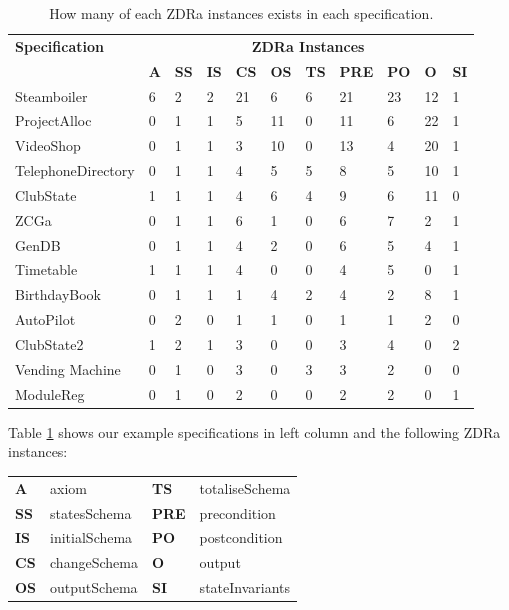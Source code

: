 \begin{table}[H]
\centering
\begin{tabular}{|l |l | l |l | l| l | l | l | l | l | l |}
\hline
\textbf{Specification} & \multicolumn{10}{c|}{\textbf{ZDRa Instances}}\\
\cline{2-11}
 & \textbf{A} & \textbf{SS} & \textbf{IS} & \textbf{CS} & \textbf{OS} &
 \textbf{TS} & \textbf{PRE} & \textbf{PO} & \textbf{O} & \textbf{SI}  \\
\hline
Steamboiler & 6 & 2 & 2 & 21 & 6 & 6 & 21 & 23 & 12 & 1  \\
ProjectAlloc & 0 & 1 & 1 & 5 & 11 & 0 & 11 & 6 & 22 & 1 \\
VideoShop &  0 & 1 & 1 & 3 & 10 & 0 & 13 & 4 & 20 & 1  \\
TelephoneDirectory & 0 & 1 & 1 & 4 & 5 & 5 & 8 & 5 & 10 & 1 \\
ClubState & 1 & 1 & 1 & 4 & 6 & 4 & 9 & 6 & 11 & 0 \\
ZCGa & 0 & 1 & 1 & 6 & 1 & 0 & 6 & 7 & 2 & 1 \\
GenDB & 0 & 1 & 1 & 4 & 2 & 0 & 6 & 5 & 4 & 1 \\
Timetable & 1 & 1 & 1 & 4 & 0 & 0 & 4 & 5 & 0 & 1 \\
BirthdayBook & 0 & 1 & 1 & 1 & 4 & 2 & 4 & 2 & 8 & 1 \\
AutoPilot & 0 & 2 & 0 & 1 & 1 & 0 & 1 & 1 & 2 & 0 \\
ClubState2 & 1 & 2 & 1 & 3 & 0 & 0 & 3 & 4 & 0 & 2 \\
Vending Machine & 0 & 1 & 0 & 3 & 0 & 3 & 3 & 2 & 0 & 0 \\
ModuleReg & 0 & 1 & 0 & 2 & 0 & 0 & 2 & 2 & 0 & 1 \\
\hline
\end{tabular}
\caption{How many of each ZDRa instances exists in each specification. \label{tab:speczdracount}}
\end{table}

Table \ref{tab:speczdracount} shows our example specifications in left column and the
following ZDRa instances:

\begin{tabular}{l l l l}
    \textbf{A} & axiom & \textbf{TS} & totaliseSchema\\
    \textbf{SS} & statesSchema & \textbf{PRE} & precondition \\
    \textbf{IS} & initialSchema & \textbf{PO} & postcondition \\
    \textbf{CS} & changeSchema & \textbf{O} & output \\
    \textbf{OS} & outputSchema & \textbf{SI} & stateInvariants \\
\end{tabular}

